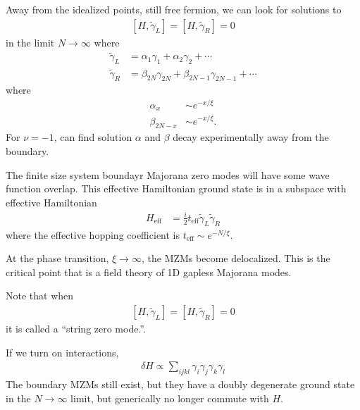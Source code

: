 Away from the idealized points,
still free fermion,
we can look for solutions to
\begin{align}
    \left[ H, \tilde{\gamma}_{L} \right]
    = \left[ H, \tilde{\gamma}_{R} \right] = 0
\end{align}
in the limit $N\to\infty$ where
\begin{align}
    \tilde{\gamma}_L &= \alpha_1 \gamma_1 + \alpha_2 \gamma_2 + \cdots\\
    \tilde{\gamma}_R &= \beta_{2N}\gamma_{2N} + \beta_{2N - 1}\gamma_{2N - 1} +
    \cdots
\end{align}
where
\begin{align}
    \alpha_x &\sim e^{-x/\xi}\\
    \beta_{2N - x} &\sim e^{-x/\xi}.
\end{align}
For $\nu=-1$,
can find solution $\alpha$ and $\beta$
decay experimentally away from the boundary.

The finite size system boundayr Majorana zero modes will have some wave function
overlap.
This effective Hamiltonian ground state is in a subspace
with effective Hamiltonian
\begin{align}
    H_{\textrm{eff}} &=
    \frac{i}{2} t_{\textrm{eff}} \tilde{\gamma}_L \tilde{\gamma}_R
\end{align}
where the effective hopping coefficient is
$t_{\textrm{eff}}\sim e^{-N/\xi}$.

At the phase transition,
$\xi\to\infty$,
the MZMs become delocalized.
This is the critical point that is a field theory of 1D gapless Majorana modes.

Note that when
\begin{align}
    \left[ H, \tilde{\gamma}_L \right]
    = \left[ H, \tilde{\gamma}_R \right] = 0
\end{align}
it is called a ``string zero mode.''.

If we turn on interactions,
\begin{align}
   \delta H \propto
   \sum_{ijkl} \gamma_i \gamma_j \gamma_k \gamma_l
\end{align}
The boundary MZMs still exist,
but they have a doubly degenerate ground state
in the $N\to\infty$ limit,
but generically no longer commute with $H$.

